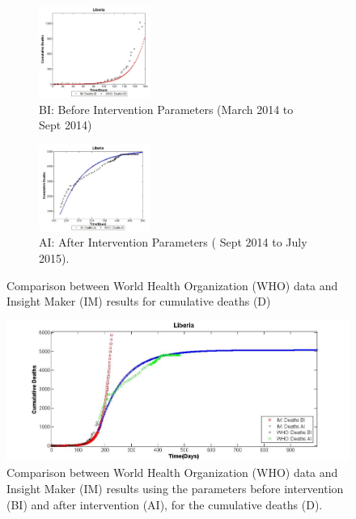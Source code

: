 \begin{figure}[h!]
 \centering 
 \begin{subfigure}[b]{\textwidth}
  \includegraphics[width=0.4\textwidth]{LB_BI_SD_WHO_IM} \caption{BI: Before Intervention Parameters (March 2014  to Sept 2014)} \label{fig:LB_BI_SD_WHO_IM} \end{subfigure}
 \hspace{.1cm}
\begin{subfigure}[b]{\textwidth}
 \includegraphics[width=0.4\textwidth]{LB_AI_SD_WHO_IM} \caption{AI: After Intervention Parameters  ( Sept 2014 to July 2015).} \label{fig:LB_AI_SD_WHO_IM} \end{subfigure} 
\caption{Comparison between World Health Organization (WHO) data and Insight Maker (IM) results for cumulative deaths (D)}
\label{fig:LB_IM_WHO} 
\end{figure}



\begin{figure}[!h]
  \centering
  \includegraphics[width=1\textwidth]{LB_Int2_SD_WHO_IM}
  \caption{ Comparison between World Health Organization (WHO) data and Insight Maker (IM) results using the parameters before intervention (BI) and after intervention (AI), for the cumulative deaths (D).}
\label{fig:LB_IM_WHO2} 
\end{figure}


